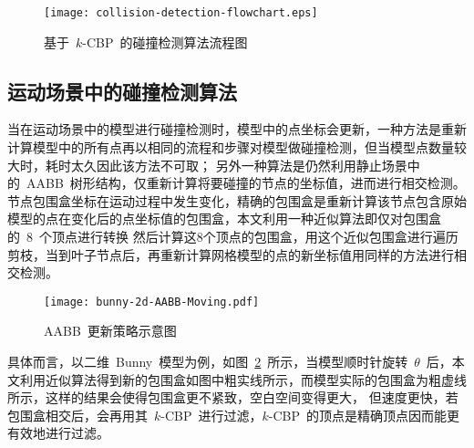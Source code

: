 \begin{figure}[htpb]
  \centering
  \texttt{[image: collision-detection-flowchart.eps]}
  \caption{基于~$k$-CBP~的碰撞检测算法流程图}
  \label{fig:flowchart:cd}
\end{figure}

\subsection{运动场景中的碰撞检测算法}
\label{subsec:moving:cd}

当在运动场景中的模型进行碰撞检测时，模型中的点坐标会更新，一种方法是重新计算模型中的所有点再以相同的流程和步骤对模型做碰撞检测，但当模型点数量较大时，耗时太久因此该方法不可取；
另外一种算法是仍然利用静止场景中的~AABB~树形结构，仅重新计算将要碰撞的节点的坐标值，进而进行相交检测。
节点包围盒坐标在运动过程中发生变化，精确的包围盒是重新计算该节点包含原始模型的点在变化后的点坐标值的包围盒，本文利用一种近似算法即仅对包围盒的~8~个顶点进行转换
然后计算这8个顶点的包围盒，用这个近似包围盒进行遍历剪枝，当到叶子节点后，再重新计算网格模型的点的新坐标值用同样的方法进行相交检测。

\begin{figure}[htbp]
  \centering
  \texttt{[image: bunny-2d-AABB-Moving.pdf]}
  \caption{AABB~更新策略示意图}
  \label{fig:bunny:moving}
\end{figure}

具体而言，以二维~Bunny~模型为例，如图~\ref{fig:bunny:moving}~所示，当模型顺时针旋转~$\theta$~后，本文利用近似算法得到新的包围盒如图中粗实线所示，而模型实际的包围盒为粗虚线所示，这样的结果会使得包围盒更不紧致，空白空间变得更大，
但速度更快，若包围盒相交后，会再用其~$k$-CBP~进行过滤，$k$-CBP~的顶点是精确顶点因而能更有效地进行过滤。

